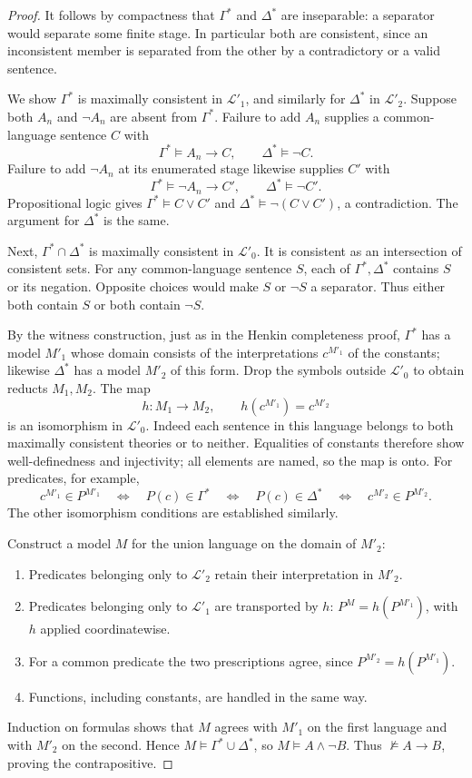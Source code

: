 \begin{proof}
It follows by compactness that $\Gamma^*$ and $\Delta^*$ are inseparable:
a separator would separate some finite stage. In particular both are
consistent, since an inconsistent member is separated from the other
by a contradictory or a valid sentence.

We show $\Gamma^*$ is maximally consistent in $\mathcal L'_1$, and
similarly for $\Delta^*$ in $\mathcal L'_2$.
Suppose both $A_n$ and $\neg A_n$ are absent from $\Gamma^*$.
Failure to add $A_n$ supplies a common-language sentence $C$ with
\[
\Gamma^*\models A_n\to C,\qquad \Delta^*\models\neg C.
\]
Failure to add $\neg A_n$ at its enumerated stage likewise supplies $C'$ with
\[
\Gamma^*\models\neg A_n\to C',\qquad \Delta^*\models\neg C'.
\]
Propositional logic gives $\Gamma^*\models C\lor C'$ and
$\Delta^*\models\neg(C\lor C')$, a contradiction.
The argument for $\Delta^*$ is the same.

Next, $\Gamma^*\cap\Delta^*$ is maximally consistent in $\mathcal L'_0$.
It is consistent as an intersection of consistent sets.
For any common-language sentence $S$, each of $\Gamma^*,\Delta^*$ contains
$S$ or its negation. Opposite choices would make $S$ or $\neg S$ a
separator. Thus either both contain $S$ or both contain $\neg S$.

By the witness construction, just as in the Henkin completeness proof,
$\Gamma^*$ has a model $M'_1$ whose domain consists of the interpretations
$c^{M'_1}$ of the constants; likewise $\Delta^*$ has a model $M'_2$ of
this form. Drop the symbols outside $\mathcal L'_0$ to obtain reducts
$M_1,M_2$. The map
\[
h:M_1\longrightarrow M_2,\qquad h(c^{M'_1})=c^{M'_2}
\]
is an isomorphism in $\mathcal L'_0$. Indeed each sentence in this
language belongs to both maximally consistent theories or to neither.
Equalities of constants therefore show well-definedness and injectivity;
all elements are named, so the map is onto. For predicates, for example,
\[
c^{M'_1}\in P^{M'_1}\quad\Longleftrightarrow\quad
P(c)\in\Gamma^*\quad\Longleftrightarrow\quad
P(c)\in\Delta^*\quad\Longleftrightarrow\quad c^{M'_2}\in P^{M'_2}.
\]
The other isomorphism conditions are established similarly.

Construct a model $M$ for the union language on the domain of $M'_2$:
\begin{enumerate}
\item Predicates belonging only to $\mathcal L'_2$ retain their
interpretation in $M'_2$.
\item Predicates belonging only to $\mathcal L'_1$ are transported by
$h$: $P^M=h(P^{M'_1})$, with $h$ applied coordinatewise.
\item For a common predicate the two prescriptions agree, since
$P^{M'_2}=h(P^{M'_1})$.
\item Functions, including constants, are handled in the same way.
\end{enumerate}
Induction on formulas shows that $M$ agrees with $M'_1$ on the first
language and with $M'_2$ on the second. Hence
$M\models\Gamma^*\cup\Delta^*$, so $M\models A\land\neg B$.
Thus $\not\models A\to B$, proving the contrapositive.
\end{proof}
